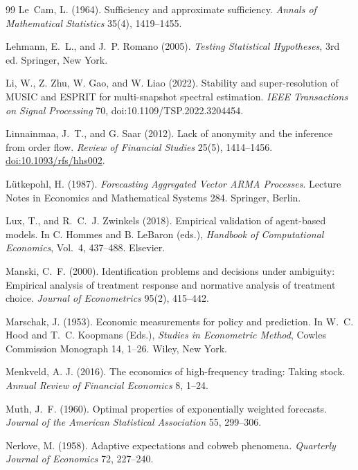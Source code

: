 \documentclass[12pt]{article}
\theoremstyle{definition}
\theoremstyle{remark}
\begin{document}
\begin{thebibliography}{99}
 Le~Cam, L. (1964). Sufficiency and approximate sufficiency. \emph{Annals of Mathematical Statistics} 35(4), 1419--1455.

 Lehmann, E.~L., and J.~P. Romano (2005). \emph{Testing Statistical Hypotheses}, 3rd ed. Springer, New York.

 Li, W., Z. Zhu, W. Gao, and W. Liao (2022). Stability and super-resolution of MUSIC and ESPRIT for multi-snapshot spectral estimation. \emph{IEEE Transactions on Signal Processing} 70, doi:10.1109/TSP.2022.3204454.

 Linnainmaa, J.~T., and G. Saar (2012). Lack of anonymity and the inference from order flow. \emph{Review of Financial Studies} 25(5), 1414--1456. \href{https://doi.org/10.1093/rfs/hhs002}{doi:10.1093/rfs/hhs002}.

 L\"utkepohl, H. (1987). \emph{Forecasting Aggregated Vector ARMA Processes}. Lecture Notes in Economics and Mathematical Systems 284. Springer, Berlin.

 Lux, T., and R.~C.~J. Zwinkels (2018). Empirical validation of agent-based models. In C. Hommes and B. LeBaron (eds.), \emph{Handbook of Computational Economics}, Vol.~4, 437--488. Elsevier.

 Manski, C.~F. (2000). Identification problems and decisions under ambiguity: Empirical analysis of treatment response and normative analysis of treatment choice. \emph{Journal of Econometrics} 95(2), 415--442.

 Marschak, J. (1953). Economic measurements for policy and prediction. In W.~C. Hood and T.~C. Koopmans (Eds.), \emph{Studies in Econometric Method}, Cowles Commission Monograph 14, 1--26. Wiley, New York.

 Menkveld, A. J. (2016). The economics of high-frequency trading: Taking stock. \emph{Annual Review of Financial Economics} 8, 1--24.

 Muth, J.~F. (1960). Optimal properties of exponentially weighted forecasts. \emph{Journal of the American Statistical Association} 55, 299--306.

 Nerlove, M. (1958). Adaptive expectations and cobweb phenomena. \emph{Quarterly Journal of Economics} 72, 227--240.


\end{thebibliography}
\end{document}
